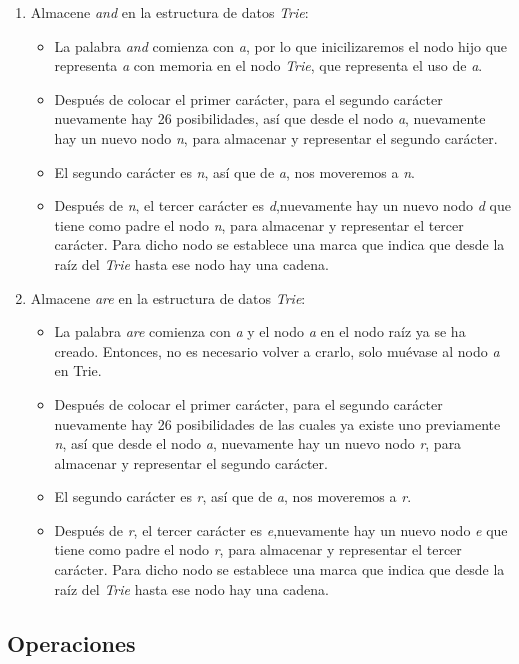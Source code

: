 \begin{enumerate}
	\item Almacene \emph{and} en la estructura de datos \emph{Trie}:
	\begin{itemize}
		\item La palabra \emph{and} comienza con \emph{a}, por lo que inicilizaremos el nodo hijo que representa \emph{a} con memoria en el nodo \emph{Trie}, que representa el uso de \emph{a}.
		\item Después de colocar el primer carácter, para el segundo carácter nuevamente hay 26 posibilidades, así que desde el nodo \emph{a}, nuevamente hay un nuevo nodo \emph{n}, para almacenar y representar el segundo carácter.
		\item El segundo carácter es \emph{n}, así que de \emph{a}, nos moveremos a \emph{n}.
		\item Después de \emph{n}, el tercer carácter es \emph{d},nuevamente hay un nuevo nodo \emph{d} que tiene como padre el nodo \emph{n}, para almacenar y representar el tercer carácter. Para dicho nodo se establece una marca que indica que desde la raíz del \emph{Trie} hasta ese nodo hay una cadena.
	\end{itemize}
	\item Almacene \emph{are} en la estructura de datos \emph{Trie}:
	\begin{itemize}
		\item La palabra \emph{are} comienza con \emph{a} y el nodo \emph{a} en el nodo raíz ya se ha creado. Entonces, no es necesario volver a crarlo, solo muévase al nodo \emph{a} en Trie.
		\item Después de colocar el primer carácter, para el segundo carácter nuevamente hay 26 posibilidades de las cuales ya existe uno previamente \emph{n}, así que desde el nodo \emph{a}, nuevamente hay un nuevo nodo \emph{r}, para almacenar y representar el segundo carácter.
		\item El segundo carácter es \emph{r}, así que de \emph{a}, nos moveremos a \emph{r}.
		\item Después de \emph{r}, el tercer carácter es \emph{e},nuevamente hay un nuevo nodo \emph{e} que tiene como padre el nodo \emph{r}, para almacenar y representar el tercer carácter. Para dicho nodo se establece una marca que indica que desde la raíz del \emph{Trie} hasta ese nodo hay una cadena.
	\end{itemize}
\end{enumerate}

\subsection{Operaciones}

